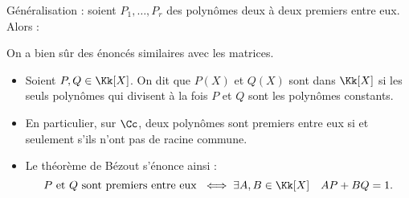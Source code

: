 \documentclass[12pt, class=report,crop=false]{standalone}
\begin{document}
Généralisation : soient $P_1,\ldots,P_r$ des polynômes deux à deux premiers entre eux. Alors :

On a bien sûr des énoncés similaires avec les matrices.

\bigskip



\begin{itemize}
  \item Soient $P,Q \in \Kk[X]$. On dit que $P(X)$ et $Q(X)$ sont  dans $\Kk[X]$ si les seuls polynômes qui divisent à la fois $P$ et $Q$ sont les polynômes constants.

  \item En particulier, sur $\Cc$, deux polynômes sont premiers entre eux si et seulement s'ils n'ont pas de racine commune.

  \item Le théorème de Bézout s'énonce ainsi :
\[P \text{ et } Q \text{ sont premiers entre eux } \iff  \exists A,B \in \Kk[X] \quad AP + BQ = 1 .\]
\end{itemize}

\bigskip
\end{document}
